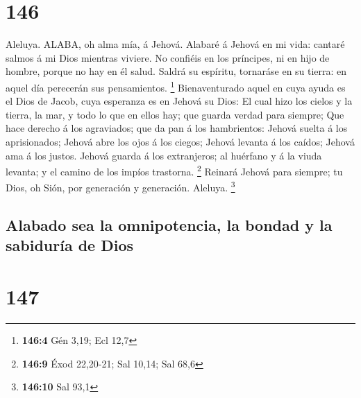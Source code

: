\hypertarget{section-145}{%
\section{146}\label{section-145}}

 Aleluya. ALABA, oh alma mía, á Jehová.  Alabaré
á Jehová en mi vida: cantaré salmos á mi Dios mientras viviere.
 No confiéis en los príncipes, ni en hijo de hombre, porque
no hay en él salud.  Saldrá su espíritu, tornaráse en su
tierra: en aquel día perecerán sus pensamientos. \footnote{\textbf{146:4}
  Gén 3,19; Ecl 12,7}  Bienaventurado aquel en cuya ayuda es
el Dios de Jacob, cuya esperanza es en Jehová su Dios:  El
cual hizo los cielos y la tierra, la mar, y todo lo que en ellos hay;
que guarda verdad para siempre;  Que hace derecho á los
agraviados; que da pan á los hambrientos: Jehová suelta á los
aprisionados;  Jehová abre los ojos á los ciegos; Jehová
levanta á los caídos; Jehová ama á los justos.  Jehová
guarda á los extranjeros; al huérfano y á la viuda levanta; y el camino
de los impíos trastorna. \footnote{\textbf{146:9} Éxod 22,20-21; Sal
  10,14; Sal 68,6}  Reinará Jehová para siempre; tu Dios,
oh Sión, por generación y generación. Aleluya. \footnote{\textbf{146:10}
  Sal 93,1}

\hypertarget{alabado-sea-la-omnipotencia-la-bondad-y-la-sabiduruxeda-de-dios}{%
\subsection{Alabado sea la omnipotencia, la bondad y la sabiduría de
Dios}\label{alabado-sea-la-omnipotencia-la-bondad-y-la-sabiduruxeda-de-dios}}

\hypertarget{section-146}{%
\section{147}\label{section-146}}


